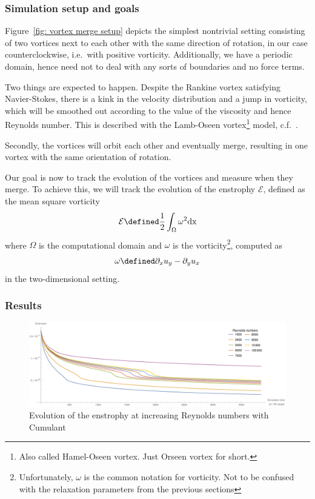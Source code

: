 \subsubsection{Simulation setup and goals}
\label{subs:Simulation setup and goals}

Figure~\ref{fig: vortex merge setup} depicts the simplest nontrivial setting consisting of two vortices next to each other with the same direction of rotation, in our case counterclockwise, i.e.\ with positive vorticity.
Additionally, we have a periodic domain, hence need not to deal with any sorts of boundaries and no force terms.

Two things are expected to happen.
Despite the Rankine vortex satisfying Navier-Stokes, there is a kink in the velocity distribution and a jump in vorticity, which will be smoothed out according to the value of the viscosity and hence Reynolds number.
This is described with the Lamb-Oseen vortex\footnote{Also called Hamel-Oseen vortex. Just Orseen vortex for short.} model, c.f.~\cite{tryggeson2007analytical}.

Secondly, the vortices will orbit each other and eventually merge, resulting in one vortex with the same orientation of rotation.

Our goal is now to track the evolution of the vortices and measure when they merge.
To achieve this, we will track the evolution of the enstrophy $\mathcal{E}$, defined as the mean square vorticity
\begin{equation*}
  \label{eq: enstrophy}
  \mathcal{E} \defined \frac{1}{2}\int_{\Omega} \omega^2 \text{dx}
\end{equation*}
where $\Omega$ is the computational domain and $\omega$ is the vorticity\footnote{Unfortunately, $\omega$ is the common notation for vorticity. Not to be confused with the relaxation parameters from the previous sections}, computed as
\begin{equation*}
  \label{eq: vorticity}
  \omega \defined \partial_x u_y - \partial_y u_x
\end{equation*}
in the two-dimensional setting.

\subsubsection{Results}
\label{subs:Results}

\begin{figure}
  \centering
  \includegraphics[width=\textwidth]{../figures/vortexMerge_enstrophy_cumulants.pdf}  %
  \caption{Evolution of the enstrophy at increasing Reynolds numbers with Cumulant}
\label{fig: rankine cumulant all}
\end{figure}

